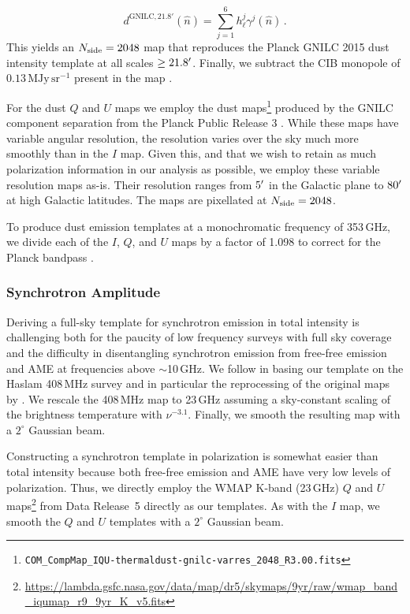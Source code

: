 \documentclass[twocolumn]{aastex631}
\begin{document}
 \begin{equation}
 d^{\text{GNILC,}\, 21.8'}(\hat{n})
=\sum_{j=1}^6 h^{j}_\ell \gamma^{j}(\hat{n})\,.
\label{eq:trucated_synthesis}
\end{equation}
This yields an $N_{\rm side} = 2048$ map that reproduces the Planck GNILC 2015 dust intensity template at all scales $\geq 21.8\mbox{$^\prime$}$. Finally, we subtract the CIB monopole of $0.13\, \text{MJy}\,\text{sr}^{-1}$ present in the map \citep[][Section~2.2]{planck2016-l11B}.

For the dust $Q$ and $U$ maps we employ the dust maps\footnote{\texttt{COM\_CompMap\_IQU-thermaldust-gnilc-varres\_2048\_R3.00.fits}} produced by the GNILC component separation from the Planck Public Release 3 \citep{planck2016-l04,planck2016-l11B}. While these maps have variable angular resolution, the resolution varies over the sky much more smoothly than in the $I$ map. Given this, and that we wish to retain as much polarization information in our analysis as possible, we employ these variable resolution maps as-is. Their resolution ranges from $5\mbox{$^\prime$}$ in the Galactic plane to $80\mbox{$^\prime$}$ at high Galactic latitudes. The maps are pixellated at $N_{\rm side} = 2048$. 

To produce dust emission templates at a monochromatic frequency of 353\,GHz, we divide each of the $I$, $Q$, and $U$ maps by a factor of 1.098 to correct for the Planck bandpass \citep[][Table~2]{planck2016-l11A}.

\subsubsection{Synchrotron Amplitude}
Deriving a full-sky template for synchrotron emission in total intensity is challenging both for the paucity of low frequency surveys with full sky coverage and the difficulty in disentangling synchrotron emission from free-free emission and AME at frequencies above $\sim$10\,GHz. We follow \citet{Thorne:2017} in basing our template on the Haslam 408\,MHz survey \citep{Haslam:1982} and in particular the reprocessing of the original maps by \citet{Remazeilles:2015}. We rescale the 408\,MHz map to 23\,GHz assuming a sky-constant scaling of the brightness temperature with $\nu^{-3.1}$. Finally, we smooth the resulting map with a $2^\circ$ Gaussian beam.

Constructing a synchrotron template in polarization is somewhat easier than total intensity because both free-free emission and AME have very low levels of polarization. Thus, we directly employ the WMAP K-band (23\,GHz) $Q$ and $U$ maps\footnote{\url{https://lambda.gsfc.nasa.gov/data/map/dr5/skymaps/9yr/raw/wmap_band_iqumap_r9_9yr_K_v5.fits}} from Data Release~5 directly as our templates. As with the $I$ map, we smooth the $Q$ and $U$ templates with a $2^\circ$ Gaussian beam.
\end{document}
